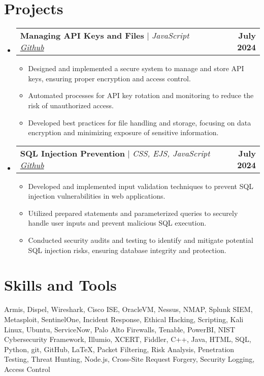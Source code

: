 \documentclass[letterpaper,11pt]{article}
\makeatletter
\newcommand{\resumeItem}[1]{
  \item\small{
    {#1 \vspace{-2pt}}
  }
}
\newcommand{\resumeProjectHeading}[2]{
    \item
    \begin{tabular*}{1.001\textwidth}{l@{\extracolsep{\fill}}r}
      \small#1 & \textbf{\small #2}\\
    \end{tabular*}\vspace{-7pt}
}
\newcommand{\resumeSubHeadingListStart}{\begin{itemize}[leftmargin=0.0in, label={}]}
\newcommand{\resumeSubHeadingListEnd}{\end{itemize}}
\newcommand{\resumeItemListStart}{\begin{itemize}}
\newcommand{\resumeItemListEnd}{\end{itemize}\vspace{-5pt}}
\makeatother
\begin{document}
\section{Projects}
    \vspace{-6pt}
    \resumeSubHeadingListStart
    \resumeProjectHeading
          {\textbf{Managing API Keys and Files} $|$ \emph{JavaScript \href{https://github.com/RaineJohnson/Node-Env-Keys-Management}{Github}}}{July 2024}
          \resumeItemListStart
            \resumeItem{Designed and implemented a secure system to manage and store API keys, ensuring proper encryption and access control.}
            \resumeItem{Automated processes for API key rotation and monitoring to reduce the risk of unauthorized access.}
            \resumeItem{Developed best practices for file handling and storage, focusing on data encryption and minimizing exposure of sensitive information.}
          \resumeItemListEnd
          \vspace{-14pt}

    \resumeProjectHeading
          {\textbf{SQL Injection Prevention} $|$ \emph{CSS, EJS, JavaScript \href{https://github.com/RaineJohnson/SQL-Injection-Project}{Github}}}{July 2024}
          \resumeItemListStart
            \resumeItem{Developed and implemented input validation techniques to prevent SQL injection vulnerabilities in web applications.}
            \resumeItem{Utilized prepared statements and parameterized queries to securely handle user inputs and prevent malicious SQL execution.}
            \resumeItem{Conducted security audits and testing to identify and mitigate potential SQL injection risks, ensuring database integrity and protection.}
          \resumeItemListEnd
          \vspace{-14pt}
    \resumeSubHeadingListEnd
\vspace{-3pt}

\section{Skills and Tools}
 \begin{itemize}[leftmargin=0.1in, label={}]
    \small{\item{
     {Armis, Dispel, Wireshark, Cisco ISE, OracleVM, Nessus, NMAP, Splunk SIEM, Metasploit, SentinelOne, Incident Response, Ethical Hacking, Scripting, Kali Linux, Ubuntu, ServiceNow, Palo Alto Firewalls, Tenable, PowerBI, NIST Cybersecurity Framework, Illumio, XCERT, Fiddler, C++, Java, HTML, SQL, Python, git, GitHub, LaTeX, Packet Filtering, Risk Analysis, Penetration Testing, Threat Hunting, Node.js, Cross-Site Request Forgery, Security Logging, Access Control} \\
     
    }}
 \end{itemize}
 \vspace{-20pt}
\end{document}
